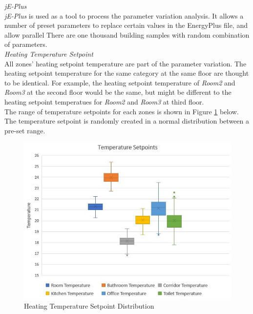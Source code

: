 \documentclass[11pt, a4paper]{article}
\theoremstyle{definition}
\begin{document}
		\textit{jE-Plus}\\
		\textit{jE-Plus} is used as a tool to process the parameter variation analysis. It allows a number of preset parameters to replace certain values in the EnergyPlus file, and allow parallel  There are one thousand building samples with random combination of parameters. \\


		\textit{Heating Temperature Setpoint}\\
			All zones' heating setpoint temperature are part of the parameter variation. The heating setpoint temperature for the same category at the same floor are thought to be identical. For example, the heating setpoint temperature of \textit{Room2} and \textit{Room3} at the second floor would be the same, but might be different to the heating setpoint temperatues for \textit{Room2} and \textit{Room3} at third floor.\\
			The range of temperature setpoints for each zones is shown in Figure \ref{fig:TempSetpoint} below. The temperature setpoint is randomly created in a normal distribution between a pre-set range.\\

			\begin{figure}[H]
			\centering
			\includegraphics[scale=0.8]{Residential_TempSetpoint.jpg}
			\caption{Heating Temperature Setpoint Distribution}
			\label{fig:TempSetpoint}
			\end{figure}
			
\end{document}
